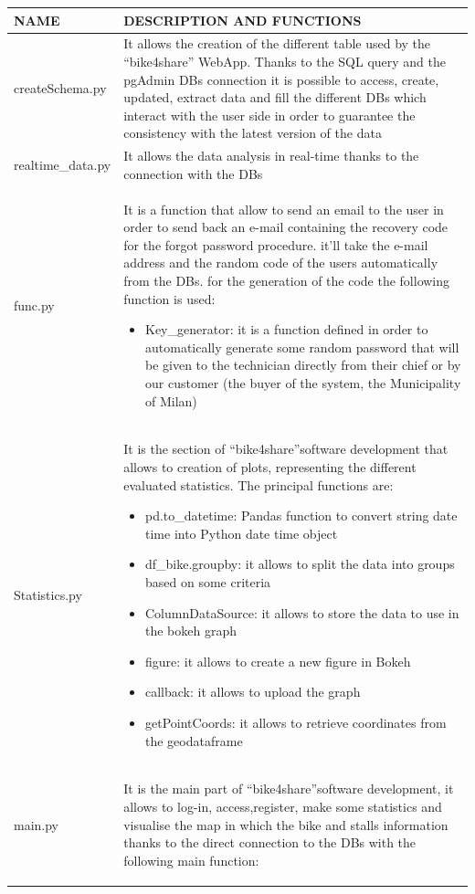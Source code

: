 \documentclass{article}
\begin{document}
    \begin{longtable}[H]{|l|p{}|} 
  
    \hline
    NAME      &         DESCRIPTION AND FUNCTIONS
      \\
      \hline
    createSchema.py &  It allows the creation of the different table used by the  “bike4share” WebApp. Thanks to the SQL query and the pgAdmin DBs connection it is possible to access, create, updated, extract data and fill the different DBs which interact with the user side in order to guarantee the consistency with the latest version of the data
      \\
    \hline 
    realtime\_data.py & It allows the data analysis in real-time thanks to the connection with the DBs
    \\
    
    \hline
    func.py & It is a function that allow to send an email to the user in order to send back an e-mail containing the recovery code for the forgot password procedure. it'll take the e-mail address and the random code of the users automatically from the DBs. for the generation of the code the following function is used:
      \begin{itemize}
         \item Key\_generator: it is a function defined in order to automatically generate some random password that will be given to the technician directly from their chief or by our customer (the buyer of the system, the Municipality of Milan)
    \end{itemize}
    \\
    \hline 
   Statistics.py & It is the section of “bike4share”software development that  allows to creation of plots, representing the different evaluated statistics. The principal functions are:
     \begin{itemize}
          \item pd.to\_datetime: Pandas function to convert string date time into Python date time object
          \item df\_bike.groupby: it allows to split the data into groups based on some criteria
          \item ColumnDataSource: it allows to store the data to use in the bokeh graph
          \item figure: it allows to create a new figure in Bokeh
          \item callback: it allows to upload the graph
          \item getPointCoords: it allows to retrieve coordinates from the geodataframe 
     \end{itemize}
       \\
    \hline
    main.py & It is the main part of “bike4share”software development, it allows to log-in, access,register, make some statistics and visualise the map in which the bike and stalls information thanks to the direct connection to the DBs with the following main function:
     \begin{itemize}
     

\end{itemize}
\end{longtable}
\end{document}
